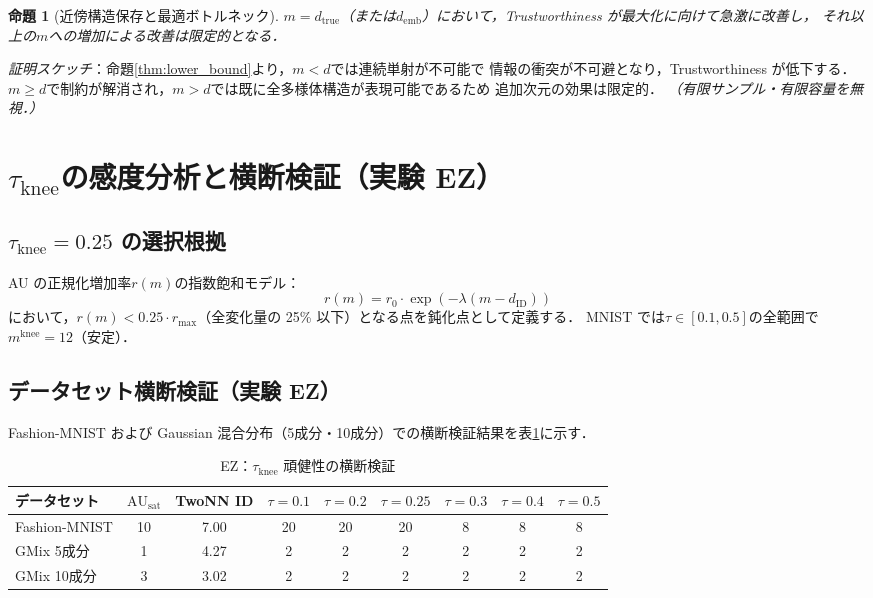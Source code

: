 \documentclass[11pt,a4paper]{jsarticle}
\newtheorem{proposition}{命題}
\newcommand{\dID}{d_{\mathrm{ID}}}
\newcommand{\dtrue}{d_{\mathrm{true}}}
\newcommand{\AUsat}{\mathrm{AU}_{\mathrm{sat}}}
\newcommand{\mknee}{m^{\mathrm{knee}}}
\newcommand{\demb}{d_{\mathrm{emb}}}
\begin{document}
\begin{proposition}[近傍構造保存と最適ボトルネック]\label{thm:trust}
$m = \dtrue$（または$\demb$）において，Trustworthiness が最大化に向けて急激に改善し，
それ以上の$m$への増加による改善は限定的となる．
\end{proposition}
\textit{証明スケッチ}：命題\ref{thm:lower_bound}より，$m < d$では連続単射が不可能で
情報の衝突が不可避となり，Trustworthiness が低下する．
$m \geq d$で制約が解消され，$m > d$では既に全多様体構造が表現可能であるため
追加次元の効果は限定的．
\textit{（有限サンプル・有限容量を無視．）}

\section{$\tau_{\mathrm{knee}}$の感度分析と横断検証（実験 EZ）}\label{app:tau_knee}

\subsection*{$\tau_{\mathrm{knee}} = 0.25$ の選択根拠}

AU の正規化増加率$r(m)$の指数飽和モデル：
\begin{equation}
  r(m) = r_0 \cdot \exp(-\lambda (m - \dID))
  \label{eq:knee_curvature}
\end{equation}
において，$r(m) < 0.25 \cdot r_{\max}$（全変化量の 25\% 以下）となる点を鈍化点として定義する．
MNIST では$\tau \in [0.1, 0.5]$の全範囲で$\mknee = 12$（安定）．

\subsection*{データセット横断検証（実験 EZ）}

Fashion-MNIST および Gaussian 混合分布（5成分・10成分）での横断検証結果を表\ref{tab:ez}に示す．

\begin{table}[H]
\centering
\caption{EZ：$\tau_{\mathrm{knee}}$ 頑健性の横断検証}
\label{tab:ez}
\small
\begin{tabular}{lcc|cccccc}
\toprule
データセット & $\AUsat$ & TwoNN ID & $\tau=0.1$ & $\tau=0.2$ & $\tau=0.25$ & $\tau=0.3$ & $\tau=0.4$ & $\tau=0.5$ \\
\midrule
Fashion-MNIST & 10 & 7.00 & 20 & 20 & 20 & 8 & 8 & 8 \\
GMix 5成分 & 1 & 4.27 & 2 & 2 & 2 & 2 & 2 & 2 \\
GMix 10成分 & 3 & 3.02 & 2 & 2 & 2 & 2 & 2 & 2 \\
\bottomrule
\end{tabular}
\end{table}
\end{document}

